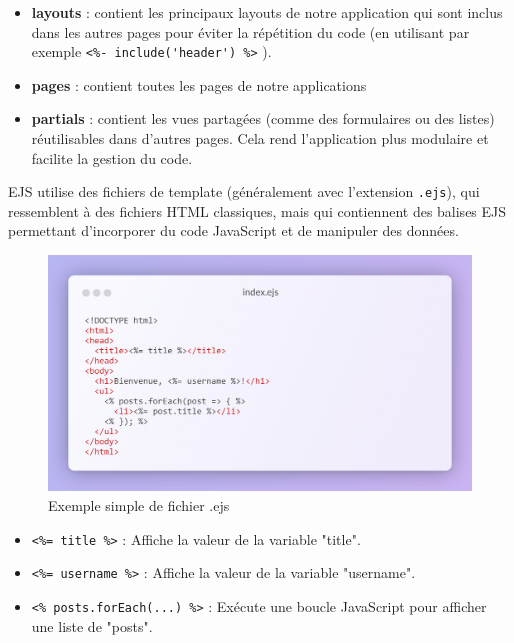 {\begin{itemize}
    \item \textbf{layouts} : contient les principaux layouts de notre application qui sont inclus dans les autres pages pour éviter la répétition du code (en utilisant par exemple \verb|<%- include('header') %>| ).
    \item \textbf{pages} : contient toutes les pages de notre applications
    \item \textbf{partials} : contient les vues partagées (comme des formulaires ou des listes) réutilisables dans d'autres pages. Cela rend l'application plus modulaire et facilite la gestion du code.
\end{itemize}

\vspace{0.35cm}

EJS utilise des fichiers de template (généralement avec l'extension \verb|.ejs|), qui ressemblent à des fichiers HTML classiques, mais qui contiennent des balises EJS permettant d'incorporer du code JavaScript et de manipuler des données.

\vspace{0.35cm}

\begin{figure}[H]
\begin{center}
\includegraphics[width=15cm]{assets/presentation/ejs-snippet.png}
\end{center}
\caption{Exemple simple de fichier .ejs}
\end{figure}

\vspace{0.35cm}

\begin{itemize}
    \item \verb|<%= title %>| : Affiche la valeur de la variable "title".
    \item \verb|<%= username %>| : Affiche la valeur de la variable "username".
    \item \verb|<% posts.forEach(...) %>| : Exécute une boucle JavaScript pour afficher une liste de "posts".
\end{itemize}

}
